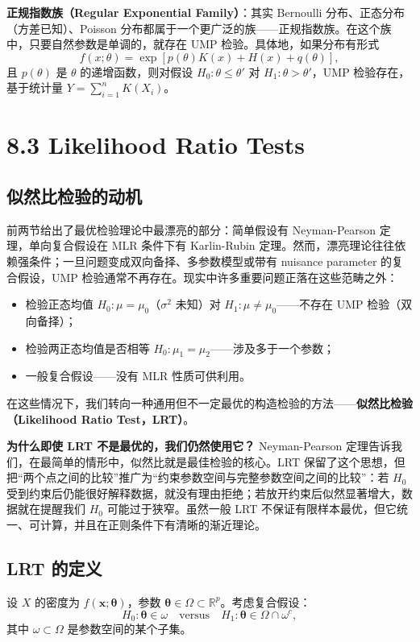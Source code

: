 \textbf{正规指数族（Regular Exponential Family）}：其实 Bernoulli 分布、正态分布（方差已知）、Poisson 分布都属于一个更广泛的族——正规指数族。在这个族中，只要自然参数是单调的，就存在 UMP 检验。具体地，如果分布有形式
\[
f(x;\theta) = \exp[p(\theta)K(x) + H(x) + q(\theta)],
\]
且 $p(\theta)$ 是 $\theta$ 的递增函数，则对假设 $H_0: \theta \leq \theta'$ 对 $H_1: \theta > \theta'$，UMP 检验存在，基于统计量 $Y = \sum_{i=1}^n K(X_i)$。
\section{8.3 Likelihood Ratio Tests}\label{sec:8.3}

\subsection{似然比检验的动机}

前两节给出了最优检验理论中最漂亮的部分：简单假设有 Neyman-Pearson 定理，单向复合假设在 MLR 条件下有 Karlin-Rubin 定理。然而，漂亮理论往往依赖强条件；一旦问题变成双向备择、多参数模型或带有 nuisance parameter 的复合假设，UMP 检验通常不再存在。现实中许多重要问题正落在这些范畴之外：

\begin{itemize}
\item 检验正态均值 $H_0: \mu = \mu_0$（$\sigma^2$ 未知）对 $H_1: \mu \neq \mu_0$——不存在 UMP 检验（双向备择）；
\item 检验两正态均值是否相等 $H_0: \mu_1 = \mu_2$——涉及多于一个参数；
\item 一般复合假设——没有 MLR 性质可供利用。
\end{itemize}

在这些情况下，我们转向一种通用但不一定最优的构造检验的方法——\textbf{似然比检验（Likelihood Ratio Test，LRT）}。

\textbf{为什么即使 LRT 不是最优的，我们仍然使用它？} Neyman-Pearson 定理告诉我们，在最简单的情形中，似然比就是最佳检验的核心。LRT 保留了这个思想，但把``两个点之间的比较''推广为``约束参数空间与完整参数空间之间的比较''：若 $H_0$ 受到约束后仍能很好解释数据，就没有理由拒绝；若放开约束后似然显著增大，数据就在提醒我们 $H_0$ 可能过于狭窄。虽然一般 LRT 不保证有限样本最优，但它统一、可计算，并且在正则条件下有清晰的渐近理论。
\subsection{LRT 的定义}

设 $X$ 的密度为 $f(\mathbf{x}; \boldsymbol{\theta})$，参数 $\boldsymbol{\theta} \in \Omega \subset \mathbb{R}^p$。考虑复合假设：
\[
H_0: \boldsymbol{\theta} \in \omega \quad \text{versus} \quad H_1: \boldsymbol{\theta} \in \Omega \cap \omega^c, \label{eq:general-hypotheses}
\]
其中 $\omega \subset \Omega$ 是参数空间的某个子集。

